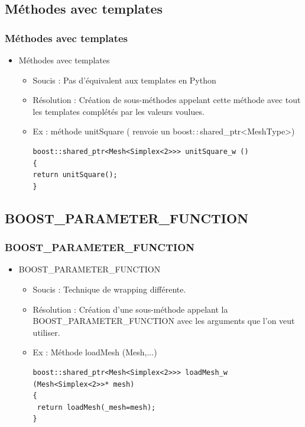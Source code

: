 \documentclass[french,10pt]{beamer}
\begin{document}
\subsection{Méthodes avec templates}
\begin{frame}[fragile]
\frametitle{Méthodes avec templates}
\begin{itemize}
\item Méthodes avec templates
\begin{itemize}
\item Soucis : Pas d'équivalent aux templates en Python
\item Résolution : Création de sous-méthodes appelant cette méthode avec tout les templates complétés par les  valeurs voulues.
\item Ex : méthode unitSquare ( renvoie un boost$::$shared\_ptr<MeshType>)
\begin{lstlisting}
boost::shared_ptr<Mesh<Simplex<2>>> unitSquare_w ()
{
return unitSquare();
}
\end{lstlisting}
\end{itemize}
\end{itemize}
\end{frame}

\subsection{BOOST\_PARAMETER\_FUNCTION}
\begin{frame}[fragile]
\frametitle{BOOST\_PARAMETER\_FUNCTION}
\begin{itemize}
\item BOOST\_PARAMETER\_FUNCTION
\begin{itemize}
\item Soucis : Technique de wrapping différente.
\item Résolution : Création d'une sous-méthode appelant la BOOST\_PARAMETER\_FUNCTION avec les arguments que l'on veut utiliser.
\item Ex : Méthode loadMesh (Mesh,...)
\begin{lstlisting}
boost::shared_ptr<Mesh<Simplex<2>>> loadMesh_w (Mesh<Simplex<2>>* mesh)
{
 return loadMesh(_mesh=mesh);
}
\end{lstlisting}
\end{itemize}
\end{itemize}
\end{frame}
\end{document}
